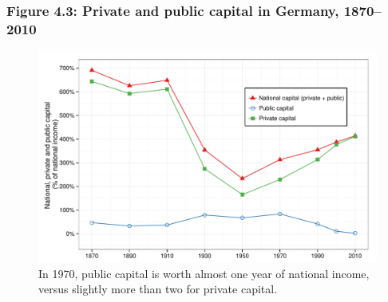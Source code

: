\documentclass[t]{beamer}\usepackage[]{graphicx}\usepackage[]{color}
\newenvironment{knitrout}{}{} %
\begin{document}
\begin{frame}[label=Figure_4_3]
\frametitle{Figure 4.3: Private and public capital in Germany, 1870--2010}
\begin{figure}[t]
\begin{minipage}[b]{\textwidth}
\centering
\begin{knitrout}\footnotesize
{}\color{fgcolor}

{\centering \includegraphics[width=1\linewidth]{figures/color/Figure_4_3} 

}



\end{knitrout}
\caption{In 1970, public capital is worth almost one year of national income, versus slightly more than two for private capital.}
\end{minipage}
\end{figure}
\end{frame}
\end{document}
